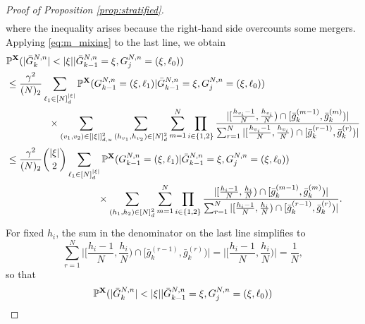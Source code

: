 \documentclass[10pt,a4paper]{amsart}
\newcommand{\bbP}{\mathbb{P}}
\newcommand{\bfX}{\mathbf{X}}
\begin{document}
\begin{proof}[Proof of Proposition \ref{prop:stratified}]
\begin{align*}
\end{align*}
where the inequality arises because the right-hand side overcounts some mergers.
Applying \eqref{eq:m_mixing} to the last line, we obtain
\begin{align}
&\bbP^{ \bfX }( | \bar{ G }_k^{ N, n } | < | \xi | | \bar{ G }_{ k - 1 }^{ N, n } = \xi, G_j^{ N, n } = ( \xi, \ell_0 ) ) \notag \\
&\leq \frac{ \gamma^2 }{ ( N )_2 } \sum_{ \ell_1 \in [ N ]_d^{ | \xi | } } \bbP^{ \bfX }( G_{ k - 1 }^{ N, n } = ( \xi, \ell_1 ) | \bar{ G }_{ k - 1 }^{ N, n } = \xi, G_j^{ N, n } = ( \xi, \ell_0 ) ) \notag \\
&\phantom{= \sum_{ \ell_1 \in [ N ]_d^{ | \xi | } } } \times \sum_{ ( v_1, v_2 ) \in [ | \xi | ]_{ d, u }^2 } \sum_{ ( h_{ v_1 }, h_{ v_2 } ) \in [ N ]_d^2 } \sum_{ m = 1 }^N \prod_{ i \in \{ 1, 2 \} } \frac{ | [ \frac{ h_{ v_i } - 1 }{ N }, \frac{ h_{ v_i } }{ N } ) \cap [ \bar{ g }_k^{ ( m - 1 ) }, \bar{ g }_k^{ ( m ) } ) | }{ \sum_{ r = 1 }^N | [ \frac{ h_{ v_i } - 1 }{ N }, \frac{ h_{ v_i } }{ N } ) \cap [ \bar{ g }_k^{ ( r - 1 ) }, \bar{ g }_k^{ ( r ) } ) | } \notag \\
&\leq \frac{ \gamma^2 }{ ( N )_2 } \binom{ | \xi | }{ 2 } \sum_{ \ell_1 \in [ N ]_d^{ | \xi | } } \bbP^{ \bfX }( G_{ k - 1 }^{ N, n } = ( \xi, \ell_1 ) | \bar{ G }_{ k - 1 }^{ N, n } = \xi, G_j^{ N, n } = ( \xi, \ell_0 ) ) \notag \\
&\phantom{\leq \frac{ \gamma^4 }{ ( N )_2 } \binom{ | \xi | }{ 2 } \sum_{ \ell_1 \in [ N ]_d^{ | \xi | } } } \times \sum_{ ( h_1, h_2 ) \in [ N ]_d^2 } \sum_{ m = 1 }^N \prod_{ i \in \{ 1, 2 \} } \frac{ | [ \frac{ h_i - 1 }{ N }, \frac{ h_i }{ N } ) \cap [ \bar{ g }_k^{ ( m - 1 ) }, \bar{ g }_k^{ ( m ) } ) | }{ \sum_{ r = 1 }^N | [ \frac{ h_i - 1 }{ N }, \frac{ h_i }{ N } ) \cap [ \bar{ g }_k^{ ( r - 1 ) }, \bar{ g }_k^{ ( r ) } ) | }. \label{sum_rearrangement}
\end{align}
For fixed $h_i$, the sum in the denominator on the last line simplifies to
\begin{equation}\label{eq:stratified_denominator}
\sum_{ r = 1 }^N  \Big| \Big[ \frac{ h_i - 1 }{ N }, \frac{ h_i }{ N } \Big) \cap [ \bar{ g }_k^{ ( r - 1 ) }, \bar{ g }_k^{ ( r ) } ) \Big| = \Big| \Big[ \frac{ h_i - 1 }{ N }, \frac{ h_i }{ N } \Big) \Big| = \frac{ 1 }{ N },
\end{equation}
so that
\begin{align}
&\bbP^{ \bfX }( | \bar{ G }_k^{ N, n } | < | \xi | | \bar{ G }_{ k - 1 }^{ N, n } = \xi, G_j^{ N, n } = ( \xi, \ell_0 ) ) \notag \\

\end{align}
\end{proof}
\end{document}
